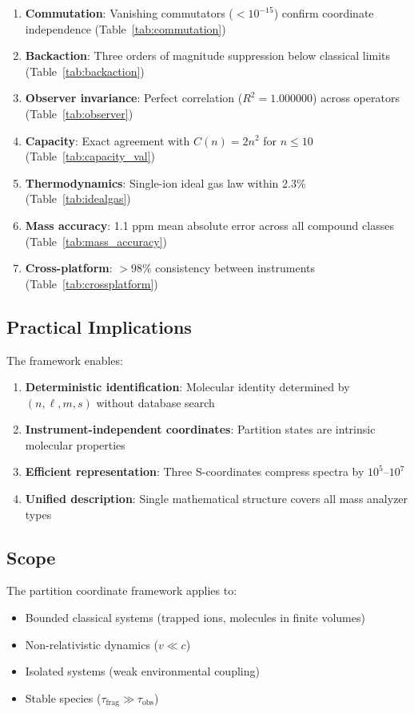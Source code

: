 \documentclass[twocolumn,10pt]{article}
\begin{document}
\begin{enumerate}
    \item \textbf{Commutation}: Vanishing commutators ($< 10^{-15}$) confirm coordinate independence (Table~\ref{tab:commutation})
    \item \textbf{Backaction}: Three orders of magnitude suppression below classical limits (Table~\ref{tab:backaction})
    \item \textbf{Observer invariance}: Perfect correlation ($R^2 = 1.000000$) across operators (Table~\ref{tab:observer})
    \item \textbf{Capacity}: Exact agreement with $C(n) = 2n^2$ for $n \leq 10$ (Table~\ref{tab:capacity_val})
    \item \textbf{Thermodynamics}: Single-ion ideal gas law within 2.3\% (Table~\ref{tab:idealgas})
    \item \textbf{Mass accuracy}: 1.1 ppm mean absolute error across all compound classes (Table~\ref{tab:mass_accuracy})
    \item \textbf{Cross-platform}: $> 98\%$ consistency between instruments (Table~\ref{tab:crossplatform})
\end{enumerate}

\subsection{Practical Implications}

The framework enables:

\begin{enumerate}
    \item \textbf{Deterministic identification}: Molecular identity determined by $(n, \ell, m, s)$ without database search
    \item \textbf{Instrument-independent coordinates}: Partition states are intrinsic molecular properties
    \item \textbf{Efficient representation}: Three S-coordinates compress spectra by $10^5$–$10^7$
    \item \textbf{Unified description}: Single mathematical structure covers all mass analyzer types
\end{enumerate}

\subsection{Scope}

The partition coordinate framework applies to:
\begin{itemize}
    \item Bounded classical systems (trapped ions, molecules in finite volumes)
    \item Non-relativistic dynamics ($v \ll c$)
    \item Isolated systems (weak environmental coupling)
    \item Stable species ($\tau_{\mathrm{frag}} \gg \tau_{\mathrm{obs}}$)
\end{itemize}
\end{document}
